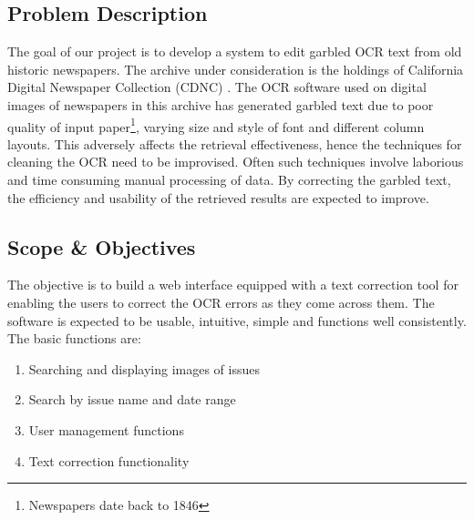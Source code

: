 \documentclass[12pt]{article}
\begin{document}
\subsection{Problem Description}
The goal of our project is to develop a system to edit garbled OCR text from old historic newspapers. The archive under consideration is the holdings of California Digital Newspaper Collection (CDNC) \cite{cdnc}. The OCR software used on digital images of newspapers in this archive has generated garbled text due to poor quality of input paper\footnote{Newspapers date back to 1846}, varying size and style of font and different column layouts. This adversely affects the retrieval effectiveness, hence the techniques for cleaning the OCR \cite{OCR} need to be improvised. Often such techniques involve laborious and time consuming manual processing of data. By correcting the garbled text, the efficiency and usability of the retrieved results are expected to improve. \\

\subsection{Scope \& Objectives}
The objective is to build a web interface equipped with a text correction tool for enabling the users to correct the OCR errors as they come across them. The software is expected to be usable, intuitive, simple and functions well consistently. 
%
The basic functions are:
\begin{enumerate}
\item Searching and displaying images of issues
\item Search by issue name and date range
\item User management functions
\item Text correction functionality
\end{enumerate}
\end{document}
